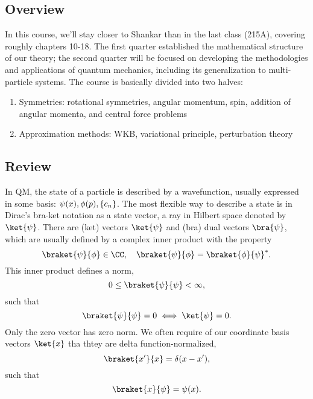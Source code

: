 \subsection*{Overview}
In this course, we'll stay closer to Shankar than in the last class (215A), covering roughly chapters 10-18. The first quarter established the mathematical structure of our theory; the second quarter will be focused on developing the methodologies and applications of quantum mechanics, including its generalization to multi-particle systems. The course is basically divided into two halves:
\begin{enumerate}
    \item Symmetries: rotational symmetries, angular momentum, spin, addition of angular momenta, and central force problems
    \item Approximation methods: WKB, variational principle, perturbation theory
\end{enumerate}

\subsection*{Review}
In QM, the state of a particle is described by a wavefunction, usually expressed in some basis: $\psi(x),\phi(p),\{c_n\}$. The most flexible way to describe a state is in Dirac's bra-ket notation as a state vector, a ray in Hilbert space denoted by $\ket{\psi}$. There are (ket) vectors $\ket{\psi}$ and (bra) dual vectors $\bra{\psi}$, which are usually defined by a complex inner product with the property
\begin{equation}
    \braket{\psi}{\phi} \in \CC, \quad \braket{\psi}{\phi} = \braket{\phi}{\psi}^*.
\end{equation}
This inner product defines a norm,
\begin{equation}
    0\leq \braket{\psi}{\psi} < \infty,
\end{equation}
such that
\begin{equation}
    \braket{\psi}{\psi} = 0 \iff \ket{\psi} = 0.
\end{equation}
Only the zero vector has zero norm. We often require of our coordinate basis vectors $\ket{x}$ tha thtey are delta function-normalized,
\begin{equation}
    \braket{x'}{x} = \delta(x-x'),
\end{equation}
such that
\begin{equation}
    \braket{x}{\psi} = \psi(x).
\end{equation}

